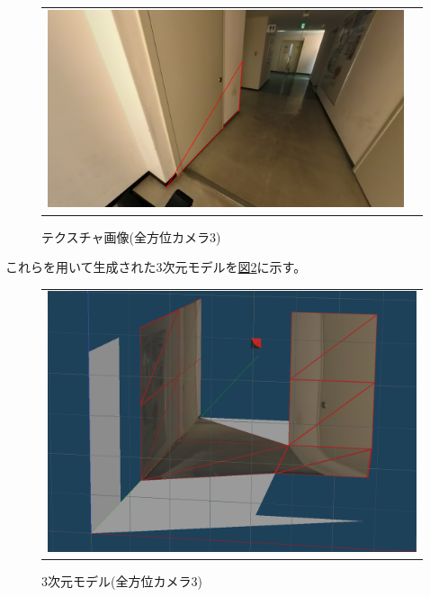 \documentclass[]{jarticle}          %
\begin{document}
\begin{figure}[H]
\begin{center}
\begin{tabular}{cc}
      \includegraphics[keepaspectratio, scale=0.08]{figures/texture2/texture_2_15.png}\\
    \end{tabular}
  \end{center}
  \caption{テクスチャ画像(全方位カメラ3)}
  \label{six}
\end{figure}

これらを用いて生成された3次元モデルを\hyperref[seven]{図\ref{seven}}に示す。

\begin{figure}[H]
  \begin{center}
    \begin{tabular}{c}
      \includegraphics[keepaspectratio, scale=0.4]{figures/3dmodel2.png}
    \end{tabular}
  \end{center}
  \caption{3次元モデル(全方位カメラ3)}
  \label{seven}
\end{figure}
\end{document}

